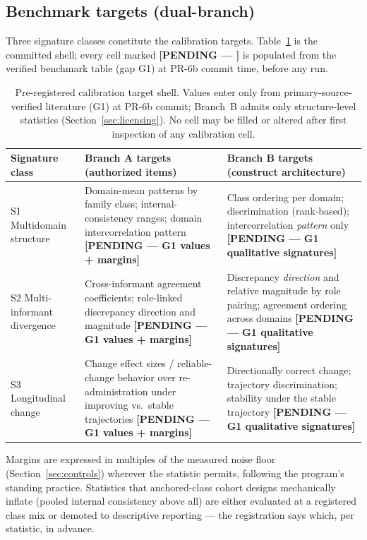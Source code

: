 \documentclass[12pt, letterpaper]{article}
\newcommand{\pending}[1]{\textcolor{blue!55!black}{\textbf{[PENDING --- #1]}}}
\begin{document}
\subsection{Benchmark targets (dual-branch)}
\label{sec:benchmarks}

Three signature classes constitute the calibration targets. Table~\ref{tab:targets} is the committed shell; every cell marked \pending{} is populated from the verified benchmark table (gap G1) at PR-6b commit time, before any run.

\begin{table}[htbp]
\centering\small
\caption{Pre-registered calibration target shell. Values enter only from primary-source-verified literature (G1) at PR-6b commit; Branch~B admits only structure-level statistics (Section~\ref{sec:licensing}). No cell may be filled or altered after first inspection of any calibration cell.}
\label{tab:targets}
\begin{tabular}{p{3.3cm}p{4.6cm}p{4.6cm}}
\toprule
Signature class & Branch A targets (authorized items) & Branch B targets (construct architecture) \\
\midrule
S1 Multidomain structure & Domain-mean patterns by family class; internal-consistency ranges; domain intercorrelation pattern \pending{G1 values + margins} & Class ordering per domain; discrimination (rank-based); intercorrelation \emph{pattern} only \pending{G1 qualitative signatures} \\
\midrule
S2 Multi-informant divergence & Cross-informant agreement coefficients; role-linked discrepancy direction and magnitude \pending{G1 values + margins} & Discrepancy \emph{direction} and relative magnitude by role pairing; agreement ordering across domains \pending{G1 qualitative signatures} \\
\midrule
S3 Longitudinal change & Change effect sizes / reliable-change behavior over re-administration under improving vs.\ stable trajectories \pending{G1 values + margins} & Directionally correct change; trajectory discrimination; stability under the stable trajectory \pending{G1 qualitative signatures} \\
\bottomrule
\end{tabular}
\end{table}

Margins are expressed in multiples of the measured noise floor (Section~\ref{sec:controls}) wherever the statistic permits, following the program's standing practice. Statistics that anchored-class cohort designs mechanically inflate (pooled internal consistency above all) are either evaluated at a registered class mix or demoted to descriptive reporting --- the registration says which, per statistic, in advance.
\end{document}
